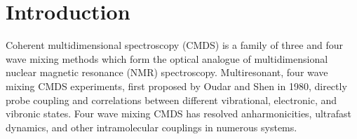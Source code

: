 \documentclass[aip, jcp, reprint, onecolumn]{revtex4-2}
\begin{document}
\maketitle

\section{Introduction}
Coherent multidimensional spectroscopy (CMDS) is a family of three and four wave mixing methods which form the optical analogue of multidimensional nuclear magnetic resonance (NMR) spectroscopy.\cite{Cho2008}
Multiresonant, four wave mixing CMDS experiments, first proposed by Oudar and Shen in 1980,\cite{RN307} directly probe coupling and correlations between different vibrational, electronic, and vibronic states. \cite{RN281, RN103, Cho2008} 
Four wave mixing CMDS has resolved anharmonicities, ultrafast dynamics, and other intramolecular couplings in numerous systems. \cite{Cho2008, Gaynor2017, Ziegler2018, Ogilvie2019, Bonn2021, RN325}
\end{document}

